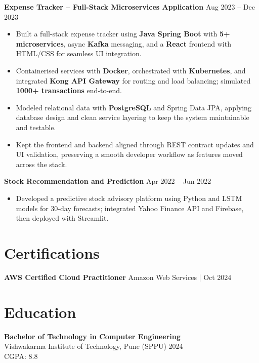 \documentclass[10pt,letterpaper]{article}
\begin{document}
\textbf{Expense Tracker -- Full-Stack Microservices Application} \hfill Aug 2023 -- Dec 2023
\begin{itemize}[leftmargin=*]
    \item Built a full-stack expense tracker using \textbf{Java Spring Boot} with \textbf{5+ microservices}, async \textbf{Kafka} messaging, and a \textbf{React} frontend with HTML/CSS for seamless UI integration.
    \item Containerised services with \textbf{Docker}, orchestrated with \textbf{Kubernetes}, and integrated \textbf{Kong API Gateway} for routing and load balancing; simulated \textbf{1000+ transactions} end-to-end.
    \item Modeled relational data with \textbf{PostgreSQL} and Spring Data JPA, applying database design and clean service layering to keep the system maintainable and testable.
    \item Kept the frontend and backend aligned through REST contract updates and UI validation, preserving a smooth developer workflow as features moved across the stack.
\end{itemize}

\textbf{Stock Recommendation and Prediction} \hfill Apr 2022 -- Jun 2022
\begin{itemize}[leftmargin=*]
    \item Developed a predictive stock advisory platform using Python and LSTM models for 30-day forecasts; integrated Yahoo Finance API and Firebase, then deployed with Streamlit.
\end{itemize}

\section*{Certifications}
\textbf{AWS Certified Cloud Practitioner} \hfill Amazon Web Services \;|\; Oct 2024 \\

\section*{Education}
\textbf{Bachelor of Technology in Computer Engineering} \\
Vishwakarma Institute of Technology, Pune (SPPU) \hfill 2024 \\
CGPA: 8.8
\end{document}
